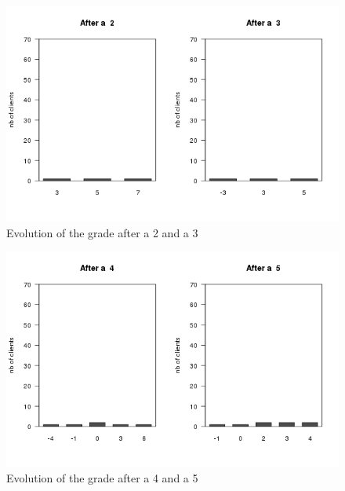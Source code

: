 \documentclass[a4paper, 11pt]{article}
\begin{document}
    \begin{figure}[!ht]
            \centering
            \includegraphics[height = 10 cm]{Remi/Evolution_of_the_grade_after_a_3.png}
            \caption{Evolution of the grade after a 2 and a 3}
            \label{fig:e_3}
    \end{figure}

    \begin{figure}[!ht]
            \centering
            \includegraphics[height = 10 cm]{Remi/Evolution_of_the_grade_after_a_5.png}
            \caption{Evolution of the grade after a 4 and a 5}
            \label{fig:e_5}
    \end{figure}
\end{document}
